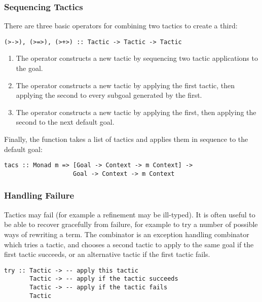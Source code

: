 \subsubsection{Sequencing Tactics}

There are three basic operators for combining two tactics to create a third:

\begin{verbatim}
(>->), (>=>), (>+>) :: Tactic -> Tactic -> Tactic
\end{verbatim}

\begin{enumerate}
\item The \hdecl{>->} operator constructs a new tactic by sequencing two
tactic applications to the  goal.

\item The \hdecl{>=>} operator constructs a new tactic by applying the first
tactic, then applying the second to every subgoal generated by the first.

\item The \hdecl{>+>} operator constructs a new tactic by applying the
  first, then applying the second to the next default goal.
\end{enumerate}

Finally, the  function takes a list of tactics and applies
them in sequence to the default goal:

\begin{verbatim}
tacs :: Monad m => [Goal -> Context -> m Context] -> 
                   Goal -> Context -> m Context
\end{verbatim}

\subsubsection{Handling Failure}

Tactics may fail (for example a refinement may be ill-typed). It is
often useful to be able to recover gracefully from failure, for
example to try a number of possible ways of rewriting a term.
The  combinator is an exception handling combinator which
tries a tactic, and chooses a second tactic to apply to the same goal
if the first tactic succeeds, or an alternative tactic if the first
tactic fails.

\begin{verbatim}
try :: Tactic -> -- apply this tactic
       Tactic -> -- apply if the tactic succeeds
       Tactic -> -- apply if the tactic fails
       Tactic
\end{verbatim}

